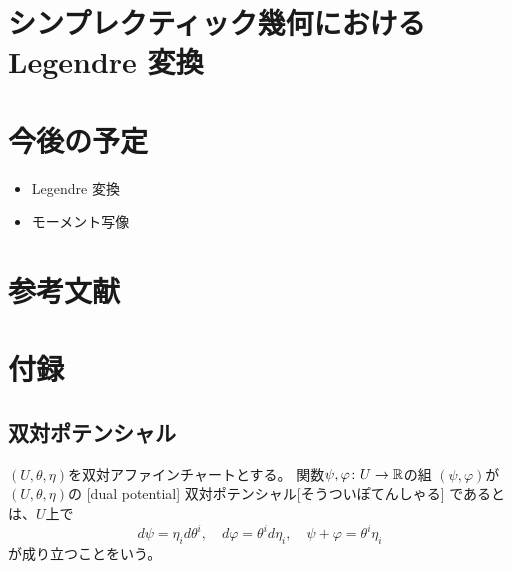 \documentclass[report]{jlreq}
\begin{document}
%
\section{シンプレクティック幾何における Legendre 変換}

\TODO{}

%
\section*{今後の予定}

\begin{itemize}
    \item Legendre 変換
    \item モーメント写像
\end{itemize}

%
\section*{参考文献}


\nocite{amari_information_2016}
\nocite{_bayes_2020}

{
    \renewcommand{\bibsection}{}
    
    
}

%
\newpage
\appendix
\renewcommand\thesection{\Alph{section}}
\setcounter{section}{0}
\section{付録}

\subsection{双対ポテンシャル}

\begin{definition}[双対ポテンシャル]
    $(U, \theta, \eta)$を双対アファインチャートとする。
    関数$\psi, \varphi \colon U \to \mathbb{R}$の組
    $(\psi, \varphi)$が$(U, \theta, \eta)$の
    [dual potential]
        {双対ポテンシャル}[そうついぽてんしゃる]
    であるとは、$U$上で
    \begin{equation}
        d\psi = \eta_i d\theta^i,
            \quad
            d\varphi = \theta^i d\eta_i,
            \quad
            \psi + \varphi = \theta^i \eta_i
    \end{equation}
    が成り立つことをいう。
\end{definition}
\end{document}
